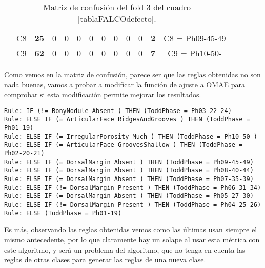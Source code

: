 \begin{table}[H]
{\begin{tabular}{|ccccccccccccc|}
\multicolumn{1}{|c|}{}                                      & \multicolumn{1}{c|}{C8} & \multicolumn{1}{c|}{\textbf{25}} & \multicolumn{1}{c|}{0}          & \multicolumn{1}{c|}{0}          & \multicolumn{1}{c|}{0}  & \multicolumn{1}{c|}{0}  & \multicolumn{1}{c|}{0}  & \multicolumn{1}{c|}{0}  & \multicolumn{1}{c|}{0}  & \multicolumn{1}{c|}{0}  & \multicolumn{1}{c|}{\textbf{2}} & C8 = Ph09-45-49   \\ \cline{2-13}
\multicolumn{1}{|c|}{}                                      & \multicolumn{1}{c|}{C9} & \multicolumn{1}{c|}{\textbf{62}} & \multicolumn{1}{c|}{0}          & \multicolumn{1}{c|}{0}          & \multicolumn{1}{c|}{0}  & \multicolumn{1}{c|}{0}  & \multicolumn{1}{c|}{0}  & \multicolumn{1}{c|}{0}  & \multicolumn{1}{c|}{0}  & \multicolumn{1}{c|}{0}  & \multicolumn{1}{c|}{\textbf{7}} & C9 = Ph10-50-     \\ \hline
\end{tabular}%
}
\caption{Matriz de confusión del fold 3 del cuadro \ref{tablaFALCOdefecto}.}
\end{table}

Como vemos en la matriz de confusión, parece ser que las reglas obtenidas no son nada buenas, vamos a probar a modificar la función de ajuste a OMAE para comprobar si esta modificación permite mejorar los resultados.

\begin{lstlisting}
Rule: IF (!= BonyNodule Absent ) THEN (ToddPhase = Ph03-22-24)
Rule: ELSE IF (= ArticularFace RidgesAndGrooves ) THEN (ToddPhase = Ph01-19)
Rule: ELSE IF (= IrregularPorosity Much ) THEN (ToddPhase = Ph10-50-)
Rule: ELSE IF (= ArticularFace GroovesShallow ) THEN (ToddPhase = Ph02-20-21)
Rule: ELSE IF (= DorsalMargin Absent ) THEN (ToddPhase = Ph09-45-49)
Rule: ELSE IF (= DorsalMargin Absent ) THEN (ToddPhase = Ph08-40-44)
Rule: ELSE IF (= DorsalMargin Absent ) THEN (ToddPhase = Ph07-35-39)
Rule: ELSE IF (!= DorsalMargin Present ) THEN (ToddPhase = Ph06-31-34)
Rule: ELSE IF (= DorsalMargin Absent ) THEN (ToddPhase = Ph05-27-30)
Rule: ELSE IF (!= DorsalMargin Present ) THEN (ToddPhase = Ph04-25-26)
Rule: ELSE (ToddPhase = Ph01-19)
\end{lstlisting}

Es más, observando las reglas obtenidas vemos como las últimas usan siempre el mismo antecedente, por lo que claramente hay un solape al usar esta métrica con este algoritmo, y será un problema del algoritmo, que no tenga en cuenta las reglas de otras clases para generar las reglas de una nueva clase.

